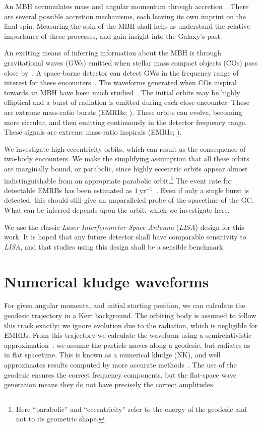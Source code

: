 \documentclass[11pt,twoside]{article}
\begin{document}
An MBH accumulates mass and angular momentum through accretion~\citep{Volonteri2010}. There are several possible accretion mechanisms, each leaving its own imprint on the final spin. Measuring the spin of the MBH shall help us understand the relative importance of these processes, and gain insight into the Galaxy's past.

An exciting means of inferring information about the MBH is through gravitational waves (GWs) emitted when stellar mass compact objects (COs) pass close by~\citep{Sathyaprakash2009}. A space-borne detector can detect GWs in the frequency range of interest for these encounters~\citep{Danzmann2003, Amaro-Seoane2012a}. The waveforms generated when COs inspiral towards an MBH have been much studied~\citep{Glampedakis2005}. The initial orbits may be highly elliptical and a burst of radiation is emitted during each close encounter. These are extreme mass-ratio bursts (EMRBs; \citealt*{Rubbo2006}). These orbits can evolve, becoming more circular, and then emitting continuously in the detector frequency range. These signals are extreme mass-ratio inspirals (EMRIs; \citealt{Amaro-Seoane2007}).

We investigate high eccentricity orbits, which can result as the consequence of two-body encounters. We make the simplifying assumption that all these orbits are marginally bound, or parabolic, since highly eccentric orbits appear almost indistinguishable from an appropriate parabolic orbit.\footnote{Here ``parabolic'' and ``eccentricity'' refer to the energy of the geodesic and not to its geometric shape.} The event rate for detectable EMRBs has been estimated as $1~\mathrm{yr^{-1}}$~\citep*{Hopman2007}. Even if only a single burst is detected, this should still give an unparalleled probe of the spacetime of the GC. What can be inferred depends upon the orbit, which we investigate here. 

We use the classic \textit{Laser Interferometer Space Antenna} (\textit{LISA}) design for this work. It is hoped that any future detector shall have comparable sensitivity to \textit{LISA}, and that studies using this design shall be a sensible benchmark.

\section{Numerical kludge waveforms}

For given angular momenta, and initial starting position, we can calculate the geodesic trajectory in a Kerr background. The orbiting body is assumed to follow this track exactly; we ignore evolution due to the radiation, which is negligible for EMRBs. From this trajectory we calculate the waveform using a semirelativistic approximation~\citep{Ruffini1981}: we assume the particle moves along a geodesic, but radiates as in flat spacetime. This is known as a numerical kludge (NK), and well approximates results computed by more accurate methods~\citep{Babak2007}. The use of the geodesic ensures the correct frequency components, but the flat-space wave generation means they do not have precisely the correct amplitudes.
\end{document}
